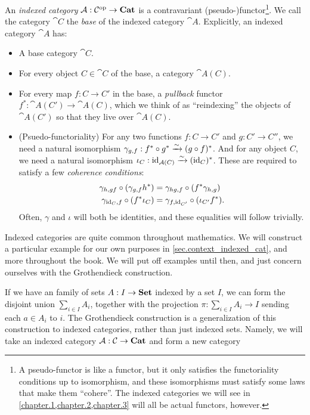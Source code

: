 \documentclass[DynamicalBook]{subfiles}
\begin{document}
\begin{definition}
  An \emph{indexed category} $\mathcal{A} : \mathcal{C}^{\textnormal{op}} \to \textbf{Cat}$ is a
  contravariant (pseudo-)functor\footnote{A pseudo-functor is like a functor,
    but it only satisfies the functoriality conditions up to isomorphism, and
    these isomorphisms must satisfy some laws that make them ``cohere''. The
    indexed categories we will see in \cref{chapter.1,chapter.2,chapter.3}
    will all be actual functors, however.}. We call the category $\cat{C}$ the
  \emph{base} of the indexed category $\cat{A}$. Explicitly, an indexed
  category $\cat{A}$ has:
  \begin{itemize}
  \item A base category $\cat{C}$.
  \item For every object $C \in \cat{C}$ of the base, a category $\cat{A}(C)$.
  \item For every map $f : C \to C'$ in the base, a \emph{pullback} functor
    $f^{\ast} : \cat{A}(C') \to \cat{A}(C)$, which we think of as ``reindexing''
    the objects of $\cat{A}(C')$ so that they live over $\cat{A}(C)$.
  \item (Psuedo-functoriality) For any two functions $f : C \to C'$ and $g : C' \to C''$, we need a
    natural isomorphism $\gamma_{g, f} : f^{\ast} \circ g^{\ast} \xrightarrow{\sim} (g \circ
    f)^{\ast}$. And for any object $C$, we need a natural isomorphism $\iota_C :
    \mathrm{id}_{\mathcal{A}(C)} \xrightarrow{\sim} (\mathrm{id}_C)^{\ast}$. These are required to satisfy a
    few \emph{coherence conditions}:
\begin{align}
  \gamma_{h,gf} \circ (\gamma_{g, f}h^{\ast}) &= \gamma_{hg, f} \circ (f^{\ast}\gamma_{h, g}) \\
  \gamma_{\mathrm{id}_C, f} \circ (f^{\ast}\iota_C) &= \gamma_{f, \mathrm{id}_{C'}} \circ (\iota_{C'} f^{\ast}).
\end{align}
   Often, $\gamma$ and $\iota$ will both be identities, and these equalities
   will follow trivially.
  \end{itemize}
\end{definition}

Indexed categories are quite common throughout mathematics. We will construct a
particular example for our own purposes in \cref{sec.context_indexed_cat}, and
more throughout the book. We will put off examples until then, and just concern
ourselves with the Grothendieck construction.

If we have an family of sets $A : I \to \textbf{Set}$ indexed by a set $I$, we can
form the disjoint union $\sum_{i \in I} A_i$, together with the projection $\pi
: \sum_{i \in I} A_i \to I$ sending each $a \in A_i$ to $i$. The Grothendieck
construction is a generalization of this construction to indexed categories,
rather than just indexed sets. Namely, we will take an indexed category $\mathcal{A}
: \mathcal{C} \to \textbf{Cat}$ and form a new category
\end{document}
